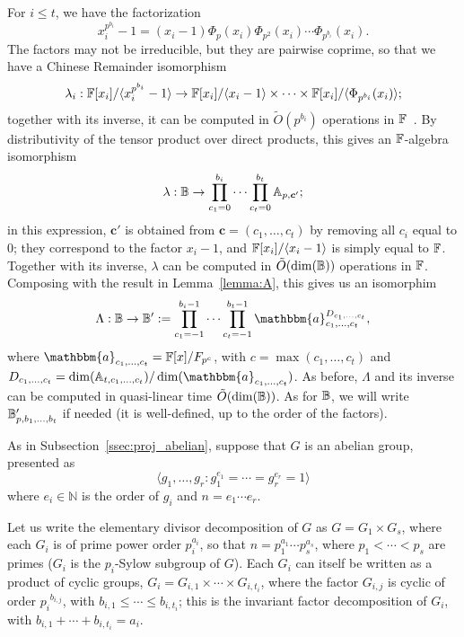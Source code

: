 For $i \le t$, we have the  factorization 
$$x_i^{p^{b_i}}-1 = (x_i-1) \Phi_p(x_i)
\Phi_{p^2}(x_i) \cdots \Phi_{p^{b_i}}(x_i).$$ The factors may not be irreducible,
but they are pairwise coprime, so that we have a Chinese Remainder
isomorphism
$$\lambda_i: \mathbb{F}[x_i]/\langle x_i^{p^{b_i}}-1 \rangle \to \mathbb{F}[x_i]/\langle x_i-1\rangle
\times \cdots \times  \mathbb{F}[x_i]/\langle \Phi_{p^{b_i}}(x_i)\rangle;$$
together with its inverse, it can be computed  
in $\tilde{O}(p^{b_i})$ operations in $\mathbb{F}$~\cite[Chapter~10]{vzGathen13}. By distributivity of the tensor
product over direct products, 
this gives an $\mathbb{F}$-algebra isomorphism
$$\lambda: \mathbb{B} \to \prod_{c_1=0}^{b_i} \cdots \prod_{c_t=0}^{b_t} \mathbb{A}_{p,\boldsymbol{c}'};$$
in this expression, $\boldsymbol{c}'$ is obtained from
$\boldsymbol{c}=(c_1,\dots,c_t)$ by removing all $c_i$ equal to $0$;
they correspond to the factor $x_i-1$, and $\mathbb{F}[x_i]/\langle x_i-1\rangle$
is simply equal to $\mathbb{F}$. Together with its inverse, 
$\lambda$ can be computed in $\tilde{O}(\dim(\mathbb{B}))$ operations in $\mathbb{F}$.
Composing with the result in Lemma~\ref{lemma:A}, this gives
us an isomorphim
$$\Lambda: \B \to \B':=\prod_{c_1=-1}^{b_i-1} \cdots \prod_{c_t=-1}^{b_t-1}
\mathbbm{a}_{c_1,\dots,c_t}^{D_{c_1,\dots,c_t}},$$ where
$\mathbbm{a}_{c_1,\dots,c_t} = \F[x]/F_{p^c}$, with $c
=\max(c_1,\dots,c_t)$ and $D_{c_1,\dots,c_t} =
\dim(\A_{t,c_1,\dots,c_t})/\dim(\mathbbm{a}_{c_1,\dots,c_t})$.  As
before, $\Lambda$ and its inverse can be computed in quasi-linear time
$\tilde{O}(\dim(\mathbb{B}))$. As for $\mathbb{B}$, we will 
write $\mathbb{B}'_{p,b_1,\dots,b_t}$ if needed (it is well-defined, up to the order of the factors).

  As in Subsection~\ref{ssec:proj_abelian}, suppose
that $G$ is an abelian group, presented as
$$ \langle g_1, \ldots , g_r: g_{1}^{e_1} = \cdots = g_{r}^{e_r} = 1
\rangle$$ where $ e_i \in \mathbb{N}$ is the order of $g_i$ and $n =
e_1 \cdots e_r$. 

Let us write the elementary divisor decomposition of $G$ as $G = G_1
\times G_s$, where each $G_i$ is of prime power order $p_i^{a_i}$, so
that $n = p_1^{a_1} \cdots p_s^{a_s}$, where $p_1 < \cdots < p_s$ are
primes ($G_i$ is the $p_i$-Sylow subgroup of $G$). Each $G_i$ can
itself be written as a product of cyclic groups, $G_i = G_{i,1} \times
\cdots \times G_{i,t_i}$, where the factor $G_{i,j}$ is cyclic of
order ${p_i}^{b_{i,j}}$, with $b_{i,1} \le \cdots \le b_{i,t_i}$; this
is the invariant factor decomposition of $G_i$, with $b_{i,1} + \cdots
+ b_{i,t_i} = a_i$.

